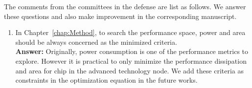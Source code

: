 
The comments from the committees in the defense are list as follows. We answer these questions and also make improvement in the corresponding manuscript.
\begin{enumerate}
  \item In Chapter~\ref{chap:Method}, to search the performance space, power and area should be always concerned as the minimized criteria. \\
  {\bf Answer:} Originally, power consumption is one of the performance metrics to explore. However it is practical to only minimize the performance dissipation and area for chip in the advanced technology node. We add these criteria as constraints in the optimization equation in the future works. 

\end{enumerate}